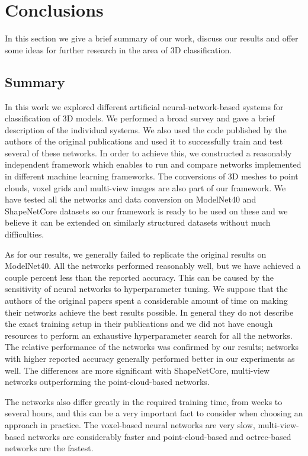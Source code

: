 \chapter{Conclusions}
\label{sec:chap6}
In this section we give a brief summary of our work, discuss our results and offer some ideas for further research in the area of 3D classification.
\section{Summary}
In this work we explored different artificial neural-network-based systems for classification of 3D models. We performed a broad survey and gave a brief description of the individual systems. We also used the code published by the authors of the original publications and used it to successfully train and test several of these networks. In order to achieve this, we constructed a reasonably independent framework which enables to run and compare networks implemented in different machine learning frameworks. The conversions of 3D meshes to point clouds, voxel grids and multi-view images are also part of our framework. We have tested all the networks and data conversion on ModelNet40 and ShapeNetCore datasets so our framework is ready to be used on these and we believe it can be extended on similarly structured datasets without much difficulties. \par
As for our results, we generally failed to replicate the original results on ModelNet40. All the networks performed reasonably well, but we have achieved a couple percent less than the reported accuracy. This can be caused by the sensitivity of neural networks to hyperparameter tuning. We suppose that the authors of the original papers spent a considerable amount of time on  making their networks achieve the best results possible. In general they do not describe the exact training setup in their publications and we did not have enough resources to perform an exhaustive hyperparameter search for all the networks.
The relative performance of the networks was confirmed by our results; networks with higher reported accuracy generally performed better in our experiments as well. The differences are more significant with ShapeNetCore, multi-view networks outperforming the point-cloud-based networks. \par
 The networks also differ greatly in the required training time, from weeks to several hours, and this can be a very important fact to consider when choosing an approach in practice. The voxel-based neural networks are very slow, multi-view-based networks are considerably faster and point-cloud-based and octree-based networks are the fastest. 

